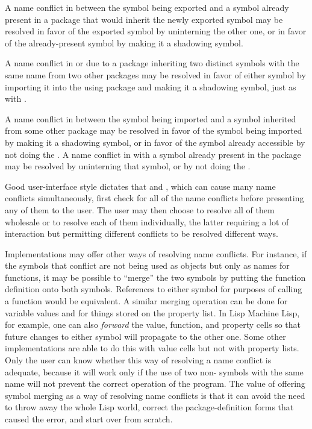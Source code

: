 A name conflict in  between the symbol being exported and a
symbol already present in a package that would inherit the
newly exported symbol may be resolved in favor of the exported symbol
by uninterning the other one, or in favor of the already-present
symbol by making it a shadowing symbol.

A name conflict in  or  due to a package
inheriting two distinct symbols with the same name from two other
packages may be resolved in favor of either symbol by importing it into
the using package and making it a shadowing symbol, just as with
.

A name conflict in  between the symbol being imported and a
symbol inherited from some other package may be resolved in favor of the
symbol being imported by making it a shadowing symbol, or in favor
of the symbol already accessible by not doing the .  A
name conflict in  with a symbol already present in the
package may be resolved by uninterning that symbol, or by not
doing the .

Good user-interface style dictates that  and ,
which can cause many name conflicts simultaneously, first check for
all of the name conflicts before presenting any of them to the user.
The user may then choose to resolve all of them wholesale or to resolve
each of them individually, the latter requiring a lot of
interaction but permitting
different conflicts to be resolved different ways.

Implementations may offer other ways of resolving name conflicts.
For instance, if the symbols that conflict are not being used as
objects but only as names for functions, it may be possible to ``merge''
the two symbols by putting the function definition onto both symbols.
References to either symbol for purposes of calling a function would be
equivalent.  A similar merging operation can be done for variable values
and for things stored on the property list.  In Lisp Machine Lisp, for example, one can
also \emph{forward} the value, function, and property cells so that future
changes to either symbol will propagate to the other one.  Some other
implementations are able to do this with value cells but not with
property lists.  Only the user can know whether this way of resolving
a name conflict is adequate, because it will work only if
the use of two non-
symbols with the same name will not prevent the correct operation of
the program.  The value of offering symbol merging as a way of resolving
name conflicts is that it can avoid the need to throw away the whole
Lisp world, correct the package-definition forms
that caused the error, and start over from scratch.

